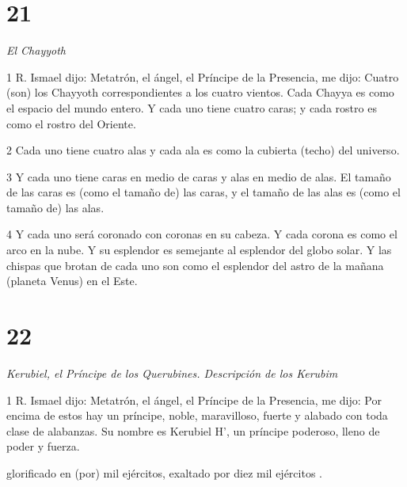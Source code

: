 \chapter{21}

\par \textit{El Chayyoth}

\par 1 R. Ismael dijo: Metatrón, el ángel, el Príncipe de la Presencia, me dijo: Cuatro (son) los Chayyoth correspondientes a los cuatro vientos. Cada Chayya es como el espacio del mundo entero. Y cada uno tiene cuatro caras; y cada rostro es como el rostro del Oriente.

\par 2 Cada uno tiene cuatro alas y cada ala es como la cubierta (techo) del universo.

\par 3 Y cada uno tiene caras en medio de caras y alas en medio de alas. El tamaño de las caras es (como el tamaño de) las caras, y el tamaño de las alas es (como el tamaño de) las alas.

\par 4 Y cada uno será coronado con coronas en su cabeza. Y cada corona es como el arco en la nube. Y su esplendor es semejante al esplendor del globo solar. Y las chispas que brotan de cada uno son como el esplendor del astro de la mañana (planeta Venus) en el Este.

\chapter{22}

\par \textit{Kerubiel, el Príncipe de los Querubines. Descripción de los Kerubim}

\par 1 R. Ismael dijo: Metatrón, el ángel, el Príncipe de la Presencia, me dijo: Por encima de estos hay un príncipe, noble, maravilloso, fuerte y alabado con toda clase de alabanzas. Su nombre es Kerubiel H', un príncipe poderoso, lleno de poder y fuerza.

\par [AD: un príncipe de alteza, y la Alteza (está) con él, un príncipe justo, y la justicia (está) con él, un príncipe santo, y la santidad (está) con él, un príncipe] [B: un príncipe de alteza, y con él (hay) un príncipe justo, de justicia, y con él un príncipe santo, de santidad, y con él (hay) un príncipe ] glorificado en (por) mil ejércitos, exaltado por diez mil ejércitos .

